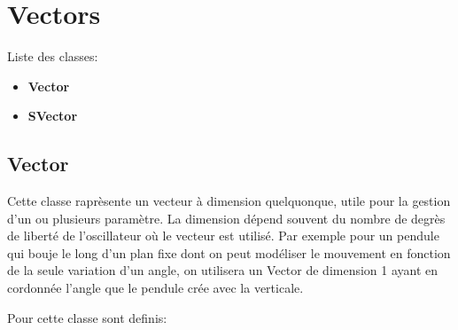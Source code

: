 \documentclass{report}
\begin{document}
\section{Vectors}

Liste des classes:

\begin{itemize}
\item \textbf{Vector}
\item \textbf{SVector}
\end{itemize}

\subsection{Vector}

Cette classe raprèsente un vecteur à dimension quelquonque, utile pour la gestion d'un ou plusieurs paramètre.
La dimension dépend souvent du nombre de degrès de liberté de l'oscillateur où le vecteur est utilisé. Par exemple
pour un pendule qui bouje le long d'un plan fixe dont on peut modéliser le mouvement en fonction de la seule variation
d'un angle, on utilisera un Vector de dimension 1 ayant en cordonnée l'angle que le pendule crée avec la verticale. 
\par
Pour cette classe sont definis: 
\end{document}
